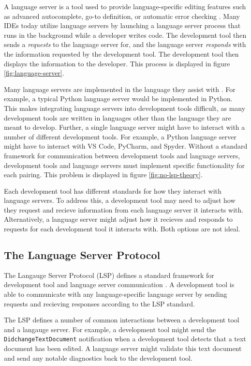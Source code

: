 \documentclass{article}
\begin{document}
A language server is a tool used to provide language-specific editing features such as advanced autocomplete, go-to definition, or automatic error checking \cite{Microsoft_2022a}. Many IDEs today utilize language servers by launching a language server process that runs in the background while a developer writes code. The development tool then sends a \emph{requests} to the language server for, and the language server \emph{responds} with the information requested by the development tool. The development tool then displays the information to the developer. This process is displayed in figure \ref{fig:language-server}.

Many language servers are implemented in the language they assist with \cite{Microsoft_2023j}. For example, a typical Python language server would be implemented in Python. This makes integrating language servers into development tools difficult, as many development tools are written in languages other than the language they are meant to develop. Further, a single language server might have to interact with a number of different development tools. For example, a Python language server might have to interact with VS Code, PyCharm, and Spyder. Without a standard framework for communication between development tools and language servers, development tools and language servers must implement specific functionality for each pairing. This problem is displayed in figure \ref{fig:no-lsp-theory}. 

Each development tool has different standards for how they interact with language servers. To address this, a development tool may need to adjust how they request and recieve information from each language server it interacts with. Alternatively, a language server might adjust how it recieves and responds to requests for each development tool it interacts with. Both options are not ideal.

\subsection{The Language Server Protocol} 

The Langauge Server Protocol (LSP) defines a standard framework for development tool and language server communication \cite{Microsoft_2022a}. A development tool is able to communicate with any language-specific language server by sending requests and recieving responses according to the LSP standard. 

The LSP defines a number of common interactions between a development tool and a langauge server. For example, a development tool might send the \lstinline{DidchangeTextDocument} notification when a development tool detects that a text document has been edited. A language server might validate this text document and send any notable diagnostics back to the development tool. 
\end{document}
